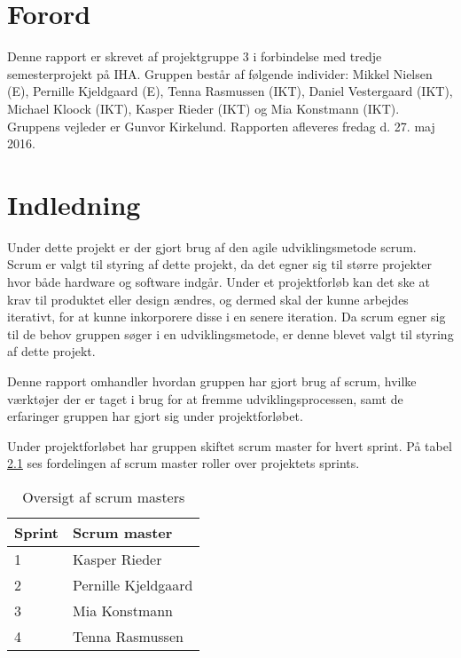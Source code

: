 \chapter{Forord}
Denne rapport er skrevet af projektgruppe 3 i forbindelse med tredje semesterprojekt på IHA. Gruppen består af følgende individer: Mikkel Nielsen (E), Pernille Kjeldgaard (E), Tenna Rasmussen (IKT), Daniel Vestergaard (IKT), Michael Kloock (IKT), Kasper Rieder (IKT) og Mia Konstmann (IKT). Gruppens vejleder er Gunvor Kirkelund. Rapporten afleveres fredag d. 27. maj 2016. 

\chapter{Indledning}
Under dette projekt er der gjort brug af den agile udviklingsmetode scrum\cite{scrumGuides}. Scrum er valgt til styring af dette projekt, da det egner sig til større projekter hvor både hardware og software indgår. Under et projektforløb kan det ske at krav til produktet eller design ændres, og dermed skal der kunne arbejdes iterativt, for at kunne inkorporere disse i en senere iteration. Da scrum egner sig til de behov gruppen søger i en udviklingsmetode, er denne blevet valgt til styring af dette projekt. \newline

\noindent Denne rapport omhandler hvordan gruppen har gjort brug af scrum, hvilke værktøjer der er taget i brug for at fremme udviklingsprocessen, samt de erfaringer gruppen har gjort sig under projektforløbet. \newline

\noindent Under projektforløbet har gruppen skiftet scrum master for hvert sprint. På tabel \ref{table:scrumMasters} ses fordelingen af scrum master roller over projektets sprints.

\begin{table}[H]
	\centering
	\begin{tabular}{|l|l|}
		\hline
		\textbf{Sprint} & \textbf{Scrum master} \\ \hline
		1               & Kasper Rieder        \\ \hline
		2               & Pernille Kjeldgaard  \\ \hline
		3               & Mia Konstmann        \\ \hline
		4               & Tenna Rasmussen      \\ \hline
	\end{tabular}
	\caption{Oversigt af scrum masters}
	\label{table:scrumMasters}
\end{table}


